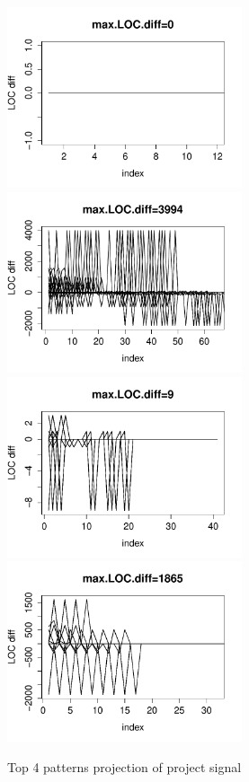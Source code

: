 \begin{figure}[H]
\caption{Top 4 patterns projection of project
signal}\label{figure:top_patterns_plots}
\centering
	\includegraphics[width=196pt]{images/pattern_1.pdf}
	\hspace{1em}
	\includegraphics[width=196pt]{images/pattern_2.pdf}
	\\
	\vspace{1em}
	\includegraphics[width=196pt]{images/pattern_3.pdf}
	\hspace{1em}
	\includegraphics[width=196pt]{images/pattern_4.pdf}
\end{figure}